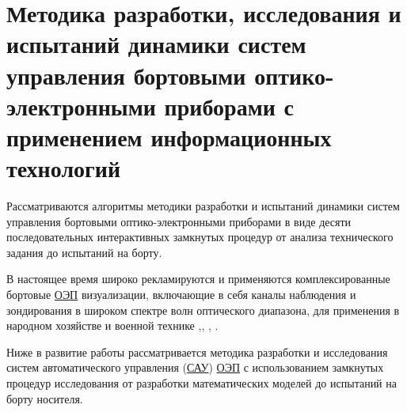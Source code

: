\chapter{Методика разработки, исследования и испытаний динамики систем управления бортовыми оптико-электронными приборами с применением информационных технологий} \label{ch:ch2}

\begin{comment}
В настоящее время наиболее распространены в народном хозяйстве и военной технике комплексированные оптико - электронные системы (КОЭП) визуализации, включающие в себя каналы наблюдения и зондирования в широком спектре волн оптического диапазона \cite[]{Tarasov},\cite[]{Belyakov},\cite[]{Karpov},\cite[]{Torshina}. Появление на рынке матричных фотоприемников расширило возможности КОЭП и К(комплексов). Несмотря на интенсивное развитие теории и методов расчета и совершенствование бортовых автоматических КОЭП и К возникают ряд вопросов, влияющих на качество получаемой оптической информации, в частности – это вопросы динамики и качества управления и увязки их с оптическими характеристиками каналов визуализации \cite[]{Belyakov},\cite[]{Karpov}, \cite[]{Baloev16}, \cite[]{Karpov17}.
\end{comment}

Рассматриваются алгоритмы методики разработки и испытаний динамики систем управления бортовыми оптико-электронными приборами в виде десяти последовательных интерактивных замкнутых процедур от анализа технического задания до испытаний на борту.
\begin{comment}
Оптико-электронные приборы (\hyperref[acroEOS]{ОЭП}) авиационного, морского, наземного и космического базирования нашли широкое применение при выполнении задач наблюдения и охраны, в том числе при решении народнохозяйственных задач и задач обороны и безопасности.
 \end{comment}
В настоящее время широко рекламируются и применяются комплексированные бортовые \hyperref[acroEOS]{ОЭП} визуализации, включающие в себя каналы наблюдения и зондирования в широком спектре волн оптического диапазона, для применения в народном хозяйстве и военной технике \cite[]{Tarasov},\cite[]{Belyakov}, \cite[]{Torshina}, \cite[]{Ivanov18}.
\begin{comment}
 Появление на рынке матричных фотоприемников расширило возможности \hyperref[acroEOS]{ОЭП} и комплексов. Несмотря на интенсивное развитие теории и методов расчета и совершенствование бортовых автоматических \hyperref[acroEOS]{ОЭП} возникает ряд вопросов, влияющих на качество получаемой оптической информации, в частности – это вопросы динамики и качества управления и увязки их с характеристиками каналов визуализации \cite[]{Tarasov},\cite[]{Belyakov}, \cite[]{Baloev16}, \cite[]{Karpov17}, \cite[]{Gerasin19}. 
 \end{comment}
 Ниже в развитие работы \cite[]{Tarasov} рассматривается методика разработки и исследования систем автоматического управления (\hyperref[acroSAU]{САУ}) \hyperref[acroEOS]{ОЭП} с использованием замкнутых процедур исследования от разработки математических моделей до испытаний на борту носителя.


